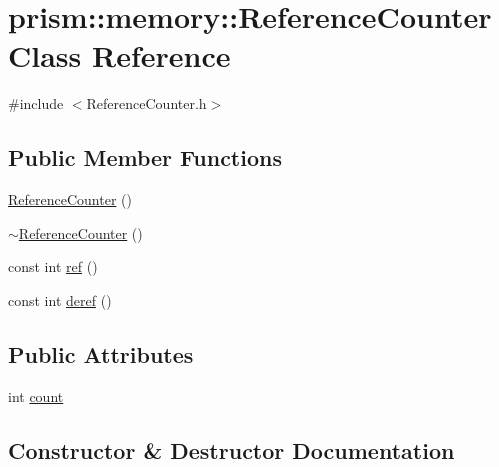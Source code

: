 \hypertarget{classprism_1_1memory_1_1_reference_counter}{}\section{prism\+:\+:memory\+:\+:Reference\+Counter Class Reference}
\label{classprism_1_1memory_1_1_reference_counter}


{\ttfamily \#include $<$Reference\+Counter.\+h$>$}

\subsection*{Public Member Functions}
\begin{DoxyCompactItemize}
\item 
\hyperlink{classprism_1_1memory_1_1_reference_counter_a579cbef71872c532ad83002be75a23d8}{Reference\+Counter} ()
\item 
\hyperlink{classprism_1_1memory_1_1_reference_counter_ac52f643a00b93db43d70a34082d64a7f}{$\sim$\+Reference\+Counter} ()
\item 
const int \hyperlink{classprism_1_1memory_1_1_reference_counter_a085a910db4335fc4ed0fa0da1ebe0795}{ref} ()
\item 
const int \hyperlink{classprism_1_1memory_1_1_reference_counter_abb6c180c28342f1f72fa114f44f2e618}{deref} ()
\end{DoxyCompactItemize}
\subsection*{Public Attributes}
\begin{DoxyCompactItemize}
\item 
int \hyperlink{classprism_1_1memory_1_1_reference_counter_af8c1c26521313d6de262c10baec32074}{count}
\end{DoxyCompactItemize}


\subsection{Constructor \& Destructor Documentation}
